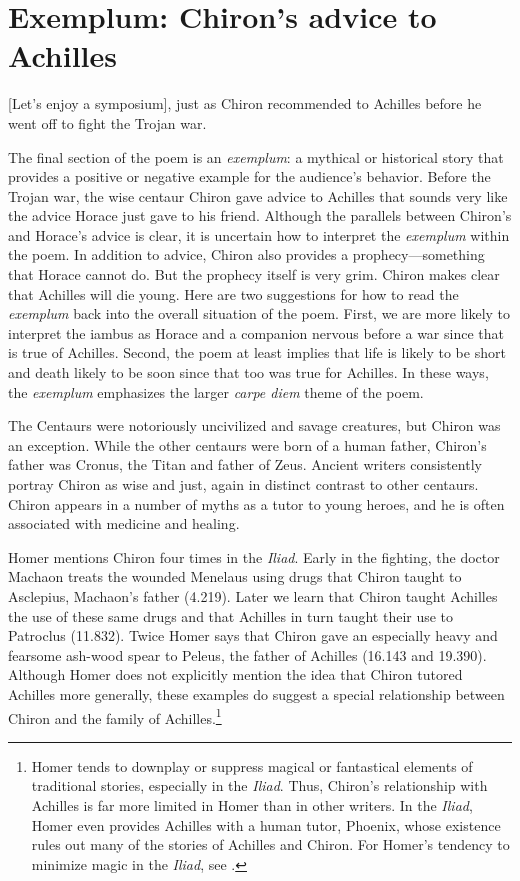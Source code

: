\section*{Exemplum: Chiron's advice to Achilles}

[Let's enjoy a symposium], just as Chiron recommended to Achilles before he went off to fight the Trojan war.

The final section of the poem is an \textit{exemplum}: a mythical or historical story that provides a positive or negative example for the audience's behavior.  Before the Trojan war, the wise centaur Chiron gave advice to Achilles that sounds very like the advice Horace just gave to his friend.  Although the parallels between Chiron's and Horace's advice is clear, it is uncertain how to interpret the \textit{exemplum} within the poem.  In addition to advice, Chiron also provides a prophecy---something that Horace cannot do.  But the prophecy itself is very grim.  Chiron makes clear that Achilles will die young.  Here are two suggestions for how to read the \textit{exemplum} back into the overall situation of the poem.  First, we are more likely to interpret the iambus as Horace and a companion nervous before a war since that is true of Achilles.  Second, the poem at least implies that life is likely to be short and death likely to be soon since that too was true for Achilles.  In these ways, the \textit{exemplum} emphasizes the larger \textit{carpe diem} theme of the poem.

The Centaurs were notoriously uncivilized and savage creatures, but Chiron was an exception.  While the other centaurs were born of a human father, Chiron's father was Cronus, the Titan and father of Zeus.  Ancient writers consistently portray Chiron as wise and just, again in distinct contrast to other centaurs.  Chiron appears in a number of myths as a tutor to young heroes, and he is often associated with medicine and healing.

Homer mentions Chiron four times in the \textit{Iliad}.  Early in the fighting, the doctor Machaon treats the wounded Menelaus using drugs that Chiron taught to Asclepius, Machaon's father (4.219).  Later we learn that Chiron taught Achilles the use of these same drugs and that Achilles in turn taught their use to Patroclus (11.832).  Twice Homer says that Chiron gave an especially heavy and fearsome ash-wood spear to Peleus, the father of Achilles (16.143 and 19.390).  Although Homer does not explicitly mention the idea that Chiron tutored Achilles more generally, these examples do suggest a special relationship between Chiron and the family of Achilles.\footnote{Homer tends to downplay or suppress magical or fantastical elements of traditional stories, especially in the \textit{Iliad}. Thus, Chiron's relationship with Achilles is far more limited in Homer than in other writers.  In the \textit{Iliad}, Homer even provides Achilles with a human tutor, Phoenix, whose existence rules out many of the stories of Achilles and Chiron.  For Homer's tendency to minimize magic in the \textit{Iliad}, see \citet[165 ff.]{griffin1983}.}

